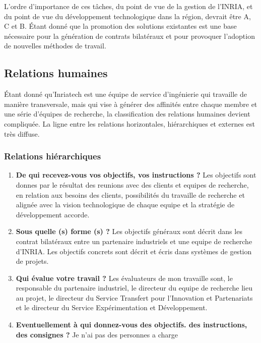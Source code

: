 \documentclass{resume} %
\begin{document}
L'ordre d'importance de ces tâches, du point de vue de la gestion de l'INRIA, et du point de vue du développement technologique dans la région, devrait être A, C et B. Étant donné que la promotion des solutions existantes est une base nécessaire pour la génération de contrats bilatéraux et pour provoquer l'adoption de nouvelles méthodes de travail. 


	\subsection{Relations humaines}
	Étant donné qu'Inriatech est une équipe de service d'ingénierie qui travaille de manière transversale, mais qui vise à générer des affinités entre chaque membre et une série d'équipes de recherche, la classification des relations humaines devient compliquée. La ligne entre les relations horizontales, hiérarchiques et externes est très diffuse.
	
		\subsubsection {Relations hiérarchiques}
		\begin{enumerate}
			\item \textbf{De qui recevez-vous vos objectifs, vos instructions ?}
				Les objectifs sont donnes par le résultat des reunions avec des clients et equipes de recherche, en relation aux besoins des clients, possibilités du travaille de recherche et alignée avec la vision technologique de chaque equipe et la stratégie de développement accorde.
		\item \textbf{Sous quelle (s) forme (s) ?}
				Les objectifs généraux sont décrit dans les contrat bilatéraux entre un partenaire industriels et une equipe de recherche d'INRIA. 
				Les objectifs concrets sont décrit et écris dans systèmes de gestion de projets. 
		\item \textbf{Qui évalue votre travail ?}
				Les évaluateurs de mon travaille sont, le responsable du partenaire industriel, le directeur du equipe de recherche lieu au projet, le directeur du Service Transfert pour l'Innovation et Partenariats et le directeur du Service Expérimentation et Développement. 
		\item  \textbf{Eventuellement à qui donnez-vous des objectifs. des instructions, des consignes ?}
			Je n'ai pas des personnes a charge 
		\end{enumerate}
\end{document}
